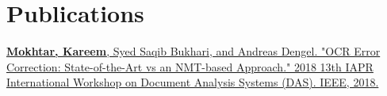 
\section{Publications}
\href{https://ieeexplore.ieee.org/abstract/document/8395234}{\textbf{Mokhtar, Kareem}, Syed Saqib Bukhari, and Andreas Dengel. "OCR Error Correction: State-of-the-Art vs an NMT-based Approach." 2018 13th IAPR International Workshop on Document Analysis Systems (DAS). IEEE, 2018.}
